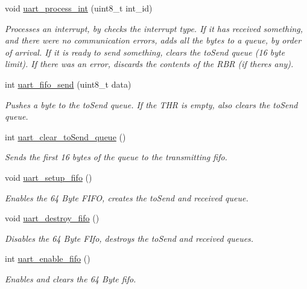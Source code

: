 \begin{DoxyCompactItemize}
void \mbox{\hyperlink{group__uart_ga1eb7fd21c4d53e035f6d522a81563ac2}{uart\+\_\+process\+\_\+int}} (uint8\+\_\+t int\+\_\+id)
\begin{DoxyCompactList}\small\item\em Processes an interrupt, by checks the interrupt type. If it has received something, and there were no communication errors, adds all the bytes to a queue, by order of arrival. If it is ready to send something, clears the to\+Send queue (16 byte limit). If there was an error, discards the contents of the R\+BR (if there\textquotesingle{}s any). \end{DoxyCompactList}\item 
int \mbox{\hyperlink{group__uart_ga583930d9069e797391526134f24113ce}{uart\+\_\+fifo\+\_\+send}} (uint8\+\_\+t data)
\begin{DoxyCompactList}\small\item\em Pushes a byte to the to\+Send queue. If the T\+HR is empty, also clears the to\+Send queue. \end{DoxyCompactList}\item 
int \mbox{\hyperlink{group__uart_ga84207f2f52e2ff2eebd95de4ad5cc3ed}{uart\+\_\+clear\+\_\+to\+Send\+\_\+queue}} ()
\begin{DoxyCompactList}\small\item\em Sends the first 16 bytes of the queue to the transmitting fifo. \end{DoxyCompactList}\item 
void \mbox{\hyperlink{group__uart_gadad7d5f52c59d4f78daa5b8030b13510}{uart\+\_\+setup\+\_\+fifo}} ()
\begin{DoxyCompactList}\small\item\em Enables the 64 Byte F\+I\+FO, creates the to\+Send and received queue. \end{DoxyCompactList}\item 
void \mbox{\hyperlink{group__uart_ga5eb3f3881ed8e1ff240400ecc1c7d20c}{uart\+\_\+destroy\+\_\+fifo}} ()
\begin{DoxyCompactList}\small\item\em Disables the 64 Byte F\+Ifo, destroys the to\+Send and received queues. \end{DoxyCompactList}\item 
int \mbox{\hyperlink{group__uart_gacc4e9858f70ddd58ddb77dd4f7cc034d}{uart\+\_\+enable\+\_\+fifo}} ()
\begin{DoxyCompactList}\small\item\em Enables and clears the 64 Byte fifo. \end{DoxyCompactList}\item 

\end{DoxyCompactItemize}
